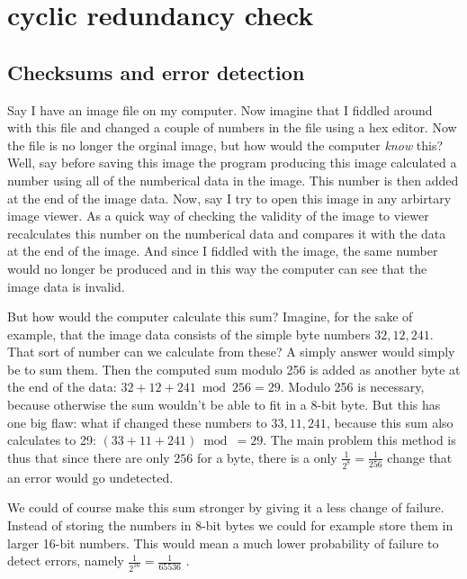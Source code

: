 \begin{comment}
  
\end{comment}


\chapter{cyclic redundancy check}
\label{cha:crc}

\section{Checksums and error detection}

Say I have an image file on my computer. Now imagine that I fiddled
around with this file and changed a couple of numbers in the file
using a hex editor. Now the file is no longer the orginal image, but
how would the computer \textit{know} this? Well, say before saving
this image the program producing this image calculated a number using
all of the numberical data in the image. This number is then added at
the end of the image data. Now, say I try to open this image in any
arbirtary image viewer. As a quick way of checking the validity of the
image to viewer recalculates this number on the numberical data and
compares it with the data at the end of the image. And since I fiddled
with the image, the same number would no longer be produced and in
this way the computer can see that the image data is invalid.

But how would the computer calculate this sum? Imagine, for the sake
of example, that the image data consists of the simple byte numbers
$32,12,241$. That sort of number can we calculate from these? A simply
answer would simply be to sum
them\cite{Williams_1993_crc_painless}. Then the computed sum modulo
256 is added as another byte at the end of the data: $32 + 12 + 241
\bmod 256 = 29$. Modulo 256 is necessary, because otherwise the sum
wouldn't be able to fit in a 8-bit byte. But this has one big flaw:
what if changed these numbers to $33,11,241$, because this sum also
calculates to 29: $(33 + 11 + 241) \bmod = 29$. The main problem this
method is thus that since there are only $256$ for a byte, there is a
only $\frac{1}{2^8} = \frac{1}{256}$ change that an error would go undetected.

We could of course make this sum stronger by giving it a less change
of failure. Instead of storing the numbers in 8-bit bytes we could for
example store them in larger 16-bit numbers. This would mean a much
lower probability of failure to detect errors, namely
$\frac{1}{2^{16}} =
\frac{1}{65536}$ \cite{Williams_1993_crc_painless}.

